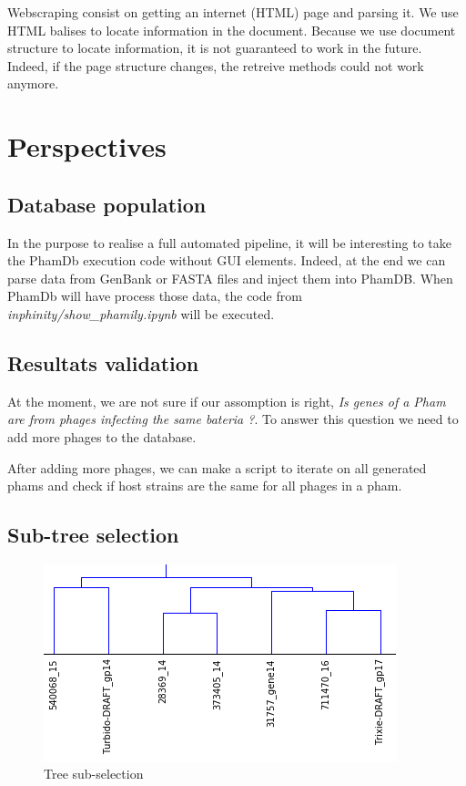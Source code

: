 \documentclass[a4paper,11pt]{report}
\begin{document}
Webscraping consist on getting an internet (HTML) page and parsing it. We use HTML balises to locate information in the document. Because we use document structure to locate information, it is not guaranteed to work in the future. Indeed, if the page structure changes, the retreive methods could not work anymore.

\section{Perspectives}
\subsection{Database population}

In the purpose to realise a full automated pipeline, it will be interesting to take the PhamDb execution code without GUI elements. Indeed, at the end we can parse data from GenBank or FASTA files and inject them into PhamDB. When PhamDb will have process those data, the code from \textit{inphinity/show\_phamily.ipynb} will be executed.

\subsection{Resultats validation}

At the moment, we are not sure if our assomption is right, \textit{Is genes of a Pham are from phages infecting the same bateria ?}. To answer this question we need to add more phages to the database.

After adding more phages, we can make a script to iterate on all generated phams and check if host strains are the same for all phages in a pham.

\subsection{Sub-tree selection}
\begin{figure}[H] 
	\begin{center}
		\includegraphics[scale=0.7]{img/tree_fig_4}
		\caption{Tree sub-selection}
	\end{center}
\end{figure}
\end{document}
